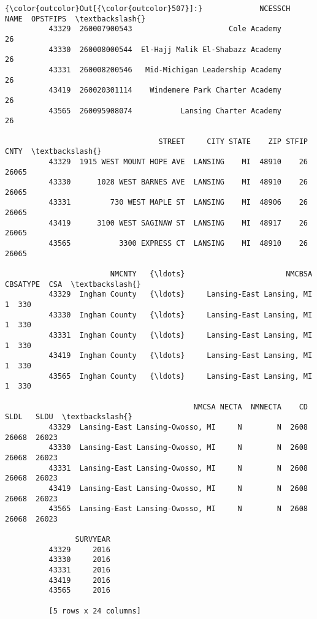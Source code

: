 \documentclass[11pt]{article}
\begin{document}
\begin{Verbatim}[commandchars=\\\{\}]
{\color{outcolor}Out[{\color{outcolor}507}]:}             NCESSCH                              NAME  OPSTFIPS  \textbackslash{}
          43329  260007900543                      Cole Academy        26   
          43330  260008000544  El-Hajj Malik El-Shabazz Academy        26   
          43331  260008200546   Mid-Michigan Leadership Academy        26   
          43419  260020301114    Windemere Park Charter Academy        26   
          43565  260095908074           Lansing Charter Academy        26   
          
                                   STREET     CITY STATE    ZIP STFIP   CNTY  \textbackslash{}
          43329  1915 WEST MOUNT HOPE AVE  LANSING    MI  48910    26  26065   
          43330      1028 WEST BARNES AVE  LANSING    MI  48910    26  26065   
          43331         730 WEST MAPLE ST  LANSING    MI  48906    26  26065   
          43419      3100 WEST SAGINAW ST  LANSING    MI  48917    26  26065   
          43565           3300 EXPRESS CT  LANSING    MI  48910    26  26065   
          
                        NMCNTY   {\ldots}                       NMCBSA  CBSATYPE  CSA  \textbackslash{}
          43329  Ingham County   {\ldots}     Lansing-East Lansing, MI         1  330   
          43330  Ingham County   {\ldots}     Lansing-East Lansing, MI         1  330   
          43331  Ingham County   {\ldots}     Lansing-East Lansing, MI         1  330   
          43419  Ingham County   {\ldots}     Lansing-East Lansing, MI         1  330   
          43565  Ingham County   {\ldots}     Lansing-East Lansing, MI         1  330   
          
                                           NMCSA NECTA  NMNECTA    CD   SLDL   SLDU  \textbackslash{}
          43329  Lansing-East Lansing-Owosso, MI     N        N  2608  26068  26023   
          43330  Lansing-East Lansing-Owosso, MI     N        N  2608  26068  26023   
          43331  Lansing-East Lansing-Owosso, MI     N        N  2608  26068  26023   
          43419  Lansing-East Lansing-Owosso, MI     N        N  2608  26068  26023   
          43565  Lansing-East Lansing-Owosso, MI     N        N  2608  26068  26023   
          
                SURVYEAR  
          43329     2016  
          43330     2016  
          43331     2016  
          43419     2016  
          43565     2016  
          
          [5 rows x 24 columns]
\end{Verbatim}
            
\end{document}
